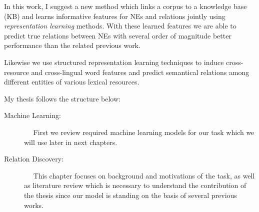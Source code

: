 In this work, I suggest a new method which links a corpus to a knowledge base
(KB) and learns informative features for NEs and relations jointly using
\emph{representation learning} methods. With these learned features we are able
to predict true relations between NEs with several order of magnitude better
performance than the related previous work.

Likewise we use structured representation learning techniques to induce
cross-resource and cross-lingual word features and predict semantical relations
among different entities of various lexical resources.

My thesis follows the structure below:
\begin{description}
\item[Machine Learning:]~~ First we review required machine learning models for
our task which we will use later in next chapters.

\item[Relation Discovery:]~~ This chapter focuses on background and
motivations of the task, as well as literature review which is necessary to understand the
contribution of the thesis since our model is standing on the basis of several
previous works.



\end{description}